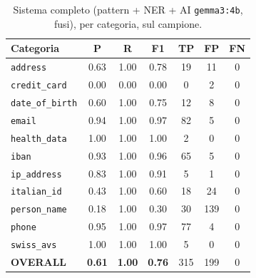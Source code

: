 \begin{table}
	\centering
	\caption{Sistema completo (pattern + NER + AI \texttt{gemma3:4b}, fusi), per categoria, sul campione.}
	\label{tab:test-sistema-intero}
	\small
	\begin{tabular}{|l|c|c|c|c|c|c|}
		\hline
		\textbf{Categoria}       & \textbf{P}    & \textbf{R}    & \textbf{F1}   & \textbf{TP} & \textbf{FP} & \textbf{FN} \\
		\hline
		\texttt{address}         & 0.63          & 1.00          & 0.78          & 19          & 11          & 0           \\
		\hline
		\texttt{credit\_card}    & 0.00          & 0.00          & 0.00          & 0           & 2           & 0           \\
		\hline
		\texttt{date\_of\_birth} & 0.60          & 1.00          & 0.75          & 12          & 8           & 0           \\
		\hline
		\texttt{email}           & 0.94          & 1.00          & 0.97          & 82          & 5           & 0           \\
		\hline
		\texttt{health\_data}    & 1.00          & 1.00          & 1.00          & 2           & 0           & 0           \\
		\hline
		\texttt{iban}            & 0.93          & 1.00          & 0.96          & 65          & 5           & 0           \\
		\hline
		\texttt{ip\_address}     & 0.83          & 1.00          & 0.91          & 5           & 1           & 0           \\
		\hline
		\texttt{italian\_id}     & 0.43          & 1.00          & 0.60          & 18          & 24          & 0           \\
		\hline
		\texttt{person\_name}    & 0.18          & 1.00          & 0.30          & 30          & 139         & 0           \\
		\hline
		\texttt{phone}           & 0.95          & 1.00          & 0.97          & 77          & 4           & 0           \\
		\hline
		\texttt{swiss\_avs}      & 1.00          & 1.00          & 1.00          & 5           & 0           & 0           \\
		\hline
		\textbf{OVERALL}         & \textbf{0.61} & \textbf{1.00} & \textbf{0.76} & 315         & 199         & 0           \\
		\hline
	\end{tabular}
\end{table}

